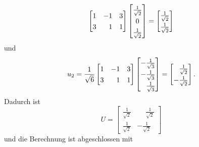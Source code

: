 \begin{example}
\begin{equation*}
\begin{bmatrix}
            1 & -1 & 3 \\
            3 & \phantom{-}1 & 1
        \end{bmatrix}
        \begingroup
        \renewcommand{\arraystretch}{1.3}
        \begin{bmatrix}
            \frac{1}{\sqrt{2}} \\
            0 \\
            \frac{1}{\sqrt{2}} \\
        \end{bmatrix}
        =
        \begin{bmatrix}
            \frac{1}{\sqrt{2}} \\
            \frac{1}{\sqrt{2}} \\
        \end{bmatrix}
        \endgroup
    \end{equation*}
    und
    \begin{equation*}
        u_2 = \frac{1}{\sqrt{6}}
        \begin{bmatrix}
            1 & -1 & 3 \\
            3 & \phantom{-}1 & 1
        \end{bmatrix}
        \begingroup
        \renewcommand{\arraystretch}{1.3}
        \begin{bmatrix}
            -\frac{1}{\sqrt{3}} \\
            -\frac{1}{\sqrt{3}} \\
            \phantom{-}\frac{1}{\sqrt{3}} \\
        \end{bmatrix}
        =
        \begin{bmatrix}
            \phantom{-}\frac{1}{\sqrt{2}} \\
            -\frac{1}{\sqrt{2}} \\
        \end{bmatrix}
        \endgroup
        .
    \end{equation*}
    Dadurch ist 
    \begin{equation*}
        \renewcommand{\arraystretch}{1.3}
        U =
        \begin{bmatrix}
            \frac{1}{\sqrt{2}} & \phantom{-}\frac{1}{\sqrt{2}} \\
            \frac{1}{\sqrt{2}} & -\frac{1}{\sqrt{2}}
        \end{bmatrix}
    \end{equation*}
    und die Berechnung ist abgeschlossen mit
    \begin{equation*}

\end{equation*}
\end{example}
